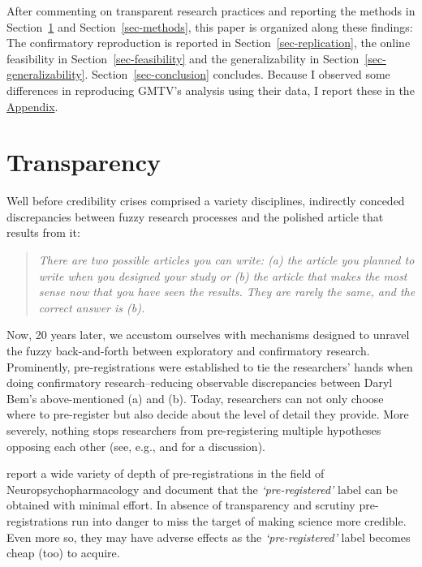 \documentclass[
  authoryear,
  preprint,
  3p]{elsarticle}
\begin{document}
After commenting on transparent research practices and reporting the
methods in Section~\ref{sec-transparency} and Section~\ref{sec-methods},
this paper is organized along these findings: The confirmatory
reproduction is reported in Section~\ref{sec-replication}, the online
feasibility in Section~\ref{sec-feasibility} and the generalizability in
Section~\ref{sec-generalizability}. Section~\ref{sec-conclusion}
concludes. Because I observed some differences in reproducing GMTV's
analysis using their data, I report these in the
\href{@sec-appendix}{Appendix}.

\hypertarget{sec-transparency}{%
\section{Transparency}\label{sec-transparency}}

Well before credibility crises comprised a variety disciplines,
\citet[p.~2]{bemwriting} indirectly conceded discrepancies between fuzzy
research processes and the polished article that results from it:

\begin{quote}
\emph{There are two possible articles you can write: (a) the article you
planned to write when you designed your study or (b) the article that
makes the most sense now that you have seen the results. They are rarely
the same, and the correct answer is (b).}
\end{quote}

Now, 20 years later, we accustom ourselves with mechanisms designed to
unravel the fuzzy back-and-forth between exploratory and confirmatory
research. Prominently, pre-registrations were established to tie the
researchers' hands when doing confirmatory research--reducing observable
discrepancies between Daryl Bem's above-mentioned (a) and (b). Today,
researchers can not only choose where to pre-register but also decide
about the level of detail they provide. More severely, nothing stops
researchers from pre-registering multiple hypotheses opposing each other
(see, e.g., \citet{SimmonsEtAl2021} and \citet{PhamEtAl2021} for a
discussion).

\citet{WaldronAllen2022} report a wide variety of depth of
pre-registrations in the field of Neuropsychopharmacology and document
that the \emph{`pre-registered'} label can be obtained with minimal
effort. In absence of transparency and scrutiny pre-registrations run
into danger to miss the target of making science more credible. Even
more so, they may have adverse effects as the \emph{`pre-registered'}
label becomes cheap (too) to acquire.
\end{document}
